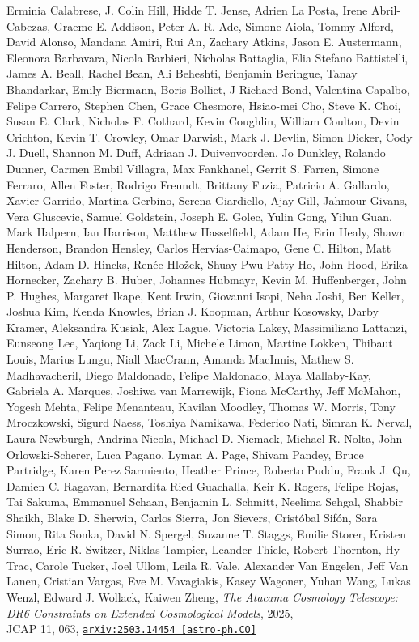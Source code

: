 \begin{minipage}{\textwidth}
Erminia Calabrese, J. Colin Hill, Hidde T. Jense, Adrien La Posta, Irene Abril-Cabezas, Graeme E. Addison, Peter A. R. Ade, Simone Aiola, Tommy Alford, David Alonso, Mandana Amiri, Rui An, Zachary Atkins, Jason E. Austermann, Eleonora Barbavara, Nicola Barbieri, Nicholas Battaglia, Elia Stefano Battistelli, James A. Beall, Rachel Bean, Ali Beheshti, Benjamin Beringue, Tanay Bhandarkar, Emily Biermann, Boris Bolliet, J Richard Bond, Valentina Capalbo, Felipe Carrero, Stephen Chen, Grace Chesmore, Hsiao-mei Cho, Steve K. Choi, Susan E. Clark, Nicholas F. Cothard, Kevin Coughlin, William Coulton, Devin Crichton, Kevin T. Crowley, Omar Darwish, Mark J. Devlin, Simon Dicker, Cody J. Duell, Shannon M. Duff, Adriaan J. Duivenvoorden, Jo Dunkley, Rolando Dunner, Carmen Embil Villagra, Max Fankhanel, Gerrit S. Farren, Simone Ferraro, Allen Foster, Rodrigo Freundt, Brittany Fuzia, Patricio A. Gallardo, Xavier Garrido, Martina Gerbino, Serena Giardiello, Ajay Gill, Jahmour Givans, Vera Gluscevic, Samuel Goldstein, Joseph E. Golec, Yulin Gong, Yilun Guan, Mark Halpern, Ian Harrison, Matthew Hasselfield, Adam He, Erin Healy, Shawn Henderson, Brandon Hensley, Carlos Herv\'ias-Caimapo, Gene C. Hilton, Matt Hilton, Adam D. Hincks, Ren\'ee Hlo\v{z}ek, Shuay-Pwu Patty Ho, John Hood, Erika Hornecker, Zachary B. Huber, Johannes Hubmayr, Kevin M. Huffenberger, John P. Hughes, Margaret Ikape, Kent Irwin, Giovanni Isopi, Neha Joshi, Ben Keller, Joshua Kim, Kenda Knowles, Brian J. Koopman, Arthur Kosowsky, Darby Kramer, Aleksandra Kusiak, Alex Lague, Victoria Lakey, Massimiliano Lattanzi, Eunseong Lee, Yaqiong Li, Zack Li, Michele Limon, Martine Lokken, Thibaut Louis, Marius Lungu, Niall MacCrann, Amanda MacInnis, Mathew S. Madhavacheril, Diego Maldonado, Felipe Maldonado, Maya Mallaby-Kay, Gabriela A. Marques, Joshiwa van Marrewijk, Fiona McCarthy, Jeff McMahon, Yogesh Mehta, Felipe Menanteau, Kavilan Moodley, Thomas W. Morris, Tony Mroczkowski, Sigurd Naess, Toshiya Namikawa, Federico Nati, Simran K. Nerval, Laura Newburgh, Andrina Nicola, Michael D. Niemack, Michael R. Nolta, John Orlowski-Scherer, Luca Pagano, Lyman A. Page, Shivam Pandey, Bruce Partridge, Karen Perez Sarmiento, Heather Prince, Roberto Puddu, Frank J. Qu, Damien C. Ragavan, Bernardita Ried Guachalla, Keir K. Rogers, Felipe Rojas, Tai Sakuma, Emmanuel Schaan, Benjamin L. Schmitt, Neelima Sehgal, Shabbir Shaikh, Blake D. Sherwin, Carlos Sierra, Jon Sievers, Crist\'obal Sif\'on, Sara Simon, Rita Sonka, David N. Spergel, Suzanne T. Staggs, Emilie Storer, Kristen Surrao, Eric R. Switzer, Niklas Tampier, Leander Thiele, Robert Thornton, Hy Trac, Carole Tucker, Joel Ullom, Leila R. Vale, Alexander Van Engelen, Jeff Van Lanen, Cristian Vargas, Eve M. Vavagiakis, Kasey Wagoner, Yuhan Wang, Lukas Wenzl, Edward J. Wollack, Kaiwen Zheng,
\emph{The Atacama Cosmology Telescope: DR6 Constraints on Extended Cosmological Models}, 2025,\\
JCAP 11, 063,
\href{http://arxiv.org/abs/2503.14454}{\mbox{\texttt{arXiv:2503.14454 [astro-ph.CO]}}}
\end{minipage}

